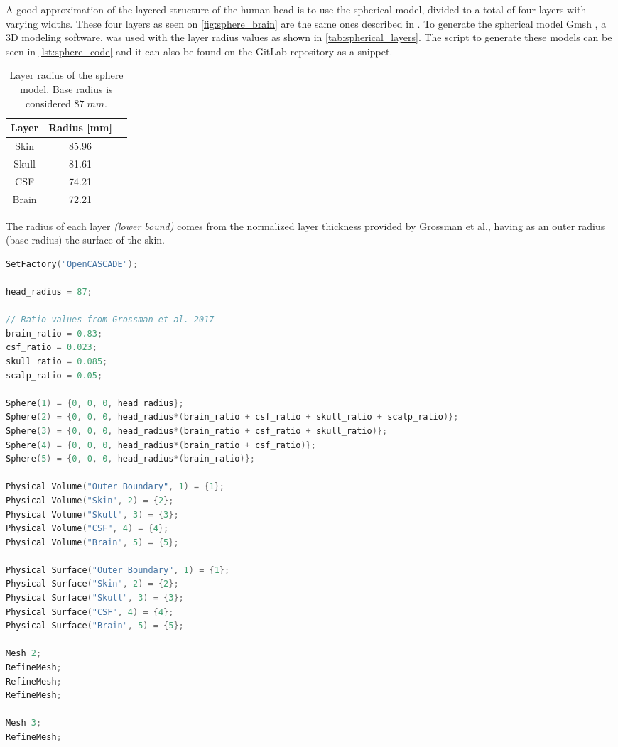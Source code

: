 A good approximation of the layered structure of the human head is to use the spherical model, divided to a total of four layers with varying widths. These four layers as seen on \autoref{fig:sphere_brain} are the same ones described in . To generate the spherical model Gmsh \cite{gmsh}, a 3D modeling software, was used with the layer radius values as shown in \autoref{tab:spherical_layers}. The script to generate these models can be seen in \autoref{lst:sphere_code} and it can also be found on the GitLab repository \cite{thesis_repo} as a snippet.
\begin{table}[!ht]
\begin{minipage}{.62\linewidth}
\centering
\caption{Layer radius of the sphere model. Base radius is considered $87\;\si{mm}$.}
\label{tab:spherical_layers}
\begin{tabular}{|c|c|c|}
\hline
\rowcolor[HTML]{C0C0C0} 
{\color[HTML]{000000} \textbf{Layer}} & {\color[HTML]{000000} \textbf{Radius {[}mm{]}}} \\ \hline
Skin & 85.96 \\ \hline
Skull & 81.61 \\ \hline
CSF & 74.21 \\ \hline
Brain & 72.21 \\ \hline
\end{tabular}
\end{minipage}
\end{table}

\noindent The radius of each layer \textit{(lower bound)} comes from the normalized layer thickness provided by Grossman et al.\cite[Figure S2, J and K]{Grossman2017}, having as an outer radius (base radius) the surface of the skin.

\begin{lstlisting}[language=C,caption={Sphere \gls{CAD} model generation code in \texttt{geo} format},captionpos=b, label=lst:sphere_code]
SetFactory("OpenCASCADE");

head_radius = 87;

// Ratio values from Grossman et al. 2017
brain_ratio = 0.83;
csf_ratio = 0.023;
skull_ratio = 0.085;
scalp_ratio = 0.05;

Sphere(1) = {0, 0, 0, head_radius};
Sphere(2) = {0, 0, 0, head_radius*(brain_ratio + csf_ratio + skull_ratio + scalp_ratio)};
Sphere(3) = {0, 0, 0, head_radius*(brain_ratio + csf_ratio + skull_ratio)};
Sphere(4) = {0, 0, 0, head_radius*(brain_ratio + csf_ratio)};
Sphere(5) = {0, 0, 0, head_radius*(brain_ratio)};

Physical Volume("Outer Boundary", 1) = {1};
Physical Volume("Skin", 2) = {2};
Physical Volume("Skull", 3) = {3};
Physical Volume("CSF", 4) = {4};
Physical Volume("Brain", 5) = {5};

Physical Surface("Outer Boundary", 1) = {1};
Physical Surface("Skin", 2) = {2};
Physical Surface("Skull", 3) = {3};
Physical Surface("CSF", 4) = {4};
Physical Surface("Brain", 5) = {5};

Mesh 2;
RefineMesh;
RefineMesh;
RefineMesh;

Mesh 3;
RefineMesh;
\end{lstlisting}

